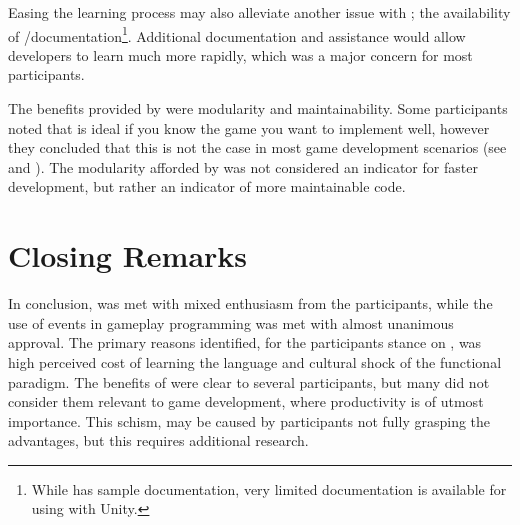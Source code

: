 Easing the learning process may also alleviate another issue with \fs; the availability of \unity/\fs documentation\footnote{While \fs has sample documentation, very limited documentation is available for using \fs with Unity.}. Additional documentation and assistance would allow developers to learn much more rapidly, which was a major concern for most participants.

The benefits provided by \fs were modularity and maintainability. Some participants noted that \fs is ideal if you know the game you want to implement well, however they concluded that this is not the case in most game development scenarios (see  and ). The modularity afforded by \fs was not considered an indicator for faster development, but rather an indicator of more maintainable code.

\section{Closing Remarks}
In conclusion, \fs was met with mixed enthusiasm from the participants, while the use of events in gameplay programming was met with almost unanimous approval. The primary reasons identified, for the participants stance on \fs, was high perceived cost of learning the language and cultural shock of the functional paradigm. The benefits of \fs were clear to several participants, but many did not consider them relevant to game development, where productivity is of utmost importance. This schism, may be caused by participants not fully grasping the advantages, but this requires additional research.
